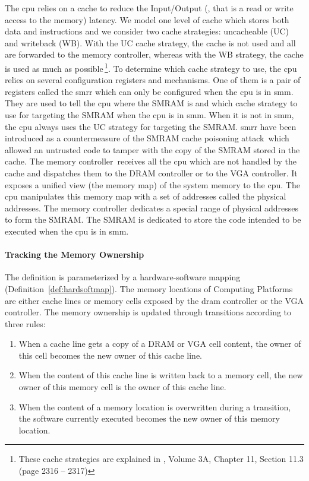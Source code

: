 The \ac{cpu} relies on a cache to reduce the Input/Output (\IO, that is a read
or write access to the memory) latency.
%
We model one level of cache which stores both data and instructions and we
consider two cache strategies: uncacheable (UC) and writeback (WB).
%
With the UC cache strategy, the cache is not used and all \IOs are forwarded to
the memory controller, whereas with the WB strategy, the cache is used as much
as possible\,\footnote{These cache strategies are explained in
  \cite{intel2014manual}, Volume 3A, Chapter 11, Section 11.3 (page 2316 --
  2317)}.
%
To determine which cache strategy to use, the \ac{cpu} relies on several
configuration registers and mechanisms.
%
One of them is a pair of registers called the \ac{smrr} which can only be
configured when the \ac{cpu} is in \ac{smm}.
%
They are used to tell the \ac{cpu} where the SMRAM is and which cache strategy
to use for \IO targeting the SMRAM when the \ac{cpu} is in \ac{smm}.  When it is
not in \ac{smm}, the \ac{cpu} always uses the UC strategy for \IO targeting the
SMRAM.
%
\ac{smrr} have been introduced as a countermeasure of the SMRAM cache poisoning
attack\,\cite{wojtczuk2009smram,duflot2009smram} which allowed an untrusted code
to tamper with the copy of the SMRAM stored in the cache.
%
The memory controller\,\cite{intel2009mch} receives all the \ac{cpu} \IOs which
are not handled by the cache and dispatches them to the DRAM controller or to
the VGA controller. It exposes a unified view (the memory map) of the system
memory to the \ac{cpu}.
%
The \ac{cpu} manipulates this memory map with a set of addresses called the
physical addresses.
%
The memory controller dedicates a special range of physical addresses to form
the SMRAM.
%
The SMRAM is dedicated to store the code intended to be executed when the
\ac{cpu} is in \ac{smm}.

\paragraph{Tracking the Memory Ownership}
%
The  definition is parameterized by a hardware-software
mapping (Definition~\ref{def:hardsoftmap}).
%
The memory locations of  Computing Platforms are either cache
lines or memory cells exposed by the \ac{dram} controller or the VGA controller.
%
The memory ownership is updated through transitions according to three rules:
%
\begin{enumerate}
\item When a cache line gets a copy of a DRAM or VGA cell content, the owner of
  this cell becomes the new owner of this cache line.
%
\item When the content of this cache line is written back to a memory cell, the
  new owner of this memory cell is the owner of this cache line.
%
\item When the content of a memory location is overwritten during a transition,
  the software currently executed becomes the new owner of this memory location.
%
\end{enumerate}

